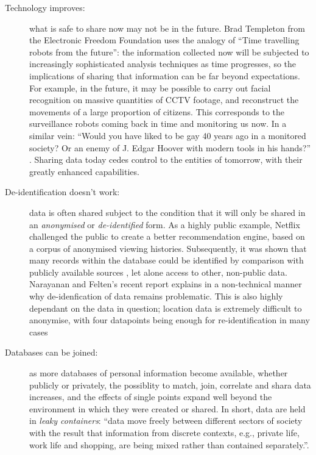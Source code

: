 \documentclass{IOS-Book-Article}     %
\begin{document}
\begin{description}
\item[Technology improves:] what is safe to share now may not be in the
future. Brad Templeton from the Electronic Freedom Foundation uses the analogy
of ``Time travelling robots from the future'': the information collected now
will be subjected to increasingly sophisticated analysis techniques as time
progresses, so the implications of sharing that information can be far beyond
expectations. For example, in the future, it may be possible to carry out facial
recognition on massive quantities of CCTV footage, and reconstruct the movements
of a large proportion of citizens. This corresponds to the surveillance
robots coming back in time and monitoring us now. In a similar vein: ``Would
you have liked to be gay 40 years ago in a monitored society? Or an enemy of J.
Edgar Hoover with modern tools in his hands?'' \cite{templetonWatched}. Sharing
data today cedes control to the entities of tomorrow, with their greatly
enhanced capabilities.
\item[De-identification doesn't work:] data is often shared subject to the
condition that it will only be shared in an \emph{anonymised} or
\emph{de-identified} form. As a highly public example, Netflix challenged the
public to create a better recommendation engine, based on a corpus of anonymised
viewing histories. Subsequently, it was shown that many records within the
database could be identified by comparison with publicly available
sources \cite{narayanan2008Deanon}, let alone access to other, non-public data.
Narayanan and Felten's recent report \cite{narayanan2014Deidentification} explains in a non-technical manner why
de-idenfication of data remains problematic. This is also highly dependant on
the data in question; location data is extremely difficult to anonymise, with
four datapoints being enough for re-identification in many cases \cite{montjoye2013Unique}
\item[Databases can be joined:] as more databases of personal information
become available, whether publicly or privately, the possiblity to match, join,
correlate and shara data increases, and the effects of single points expand well
beyond the environment in which they were created or shared. In short, data are
held in \emph{leaky containers}: ``data move freely between different sectors of
society with the result that information from discrete contexts, e.g.,
 private life, work life and shopping, are being mixed rather than contained 
 separately.''\cite[p.37--44]{lyon2001surveillance}.
\end{description}
\end{document}
